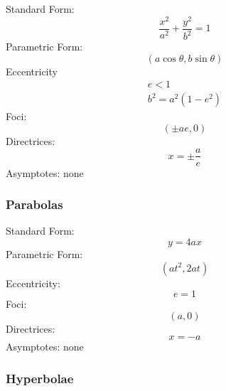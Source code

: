     Standard Form:
    \begin{equation}
        \frac{x^2}{a^2}+\frac{y^2}{b^2}=1
    \end{equation}
    Parametric Form:
    \begin{equation}
        (a\cos\theta,b\sin\theta)
    \end{equation}
    Eccentricity
    \begin{equation}
        \begin{gathered}
            e<1 \\ b^2=a^2(1-e^2)
        \end{gathered}
    \end{equation}
    Foci:
    \begin{equation}
        (\pm ae,0)
    \end{equation}
    Directrices:
    \begin{equation}
        x=\pm\frac{a}{e}
    \end{equation}
    Asymptotes: none

    \subsubsection{Parabolas}

    Standard Form:
    \begin{equation}
        y=4ax
    \end{equation}
    Parametric Form:
    \begin{equation}
        (at^2,2at)
    \end{equation}
    Eccentricity:
    \begin{equation}
        e=1
    \end{equation}
    Foci:
    \begin{equation}
        (a,0)
    \end{equation}
    Directrices:
    \begin{equation}
        x=-a
    \end{equation}
    Asymptotes: none

    \subsubsection{Hyperbolae}

